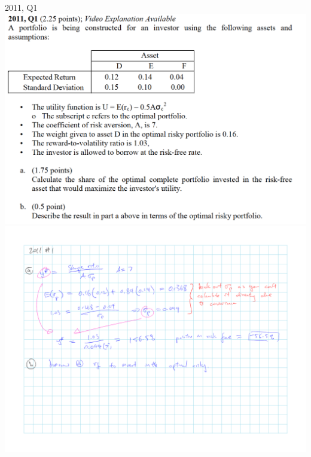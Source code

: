 \documentclass[]{book}
\theoremstyle{definition}
\theoremstyle{definition}
\theoremstyle{remark}
\begin{document}
 2011, Q1 \includegraphics{questions/2011-1Q.png}
\includegraphics{questions/2011-1A.png}
\end{document}
